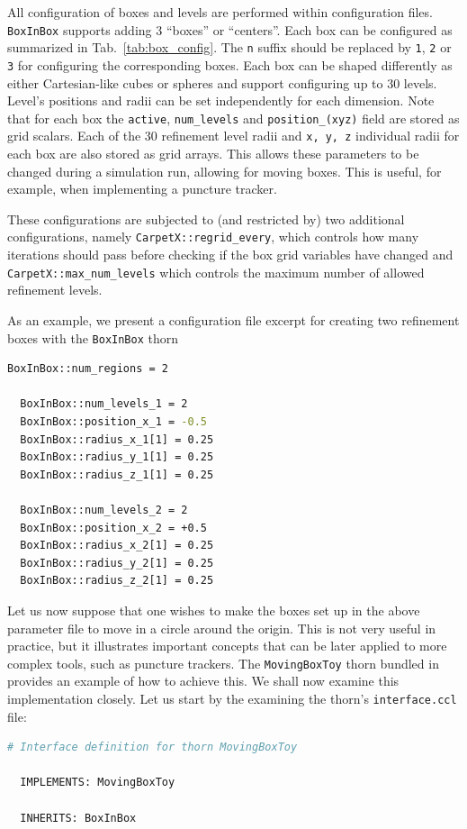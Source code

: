 All configuration of boxes and levels are performed within configuration files. \texttt{BoxInBox} supports adding 3 ``boxes'' or ``centers''. Each box can be configured as summarized in Tab.~\ref{tab:box_config}. The \texttt{n} suffix should be replaced by \texttt{1}, \texttt{2} or \texttt{3} for configuring the corresponding boxes. Each box can be shaped differently as either Cartesian-like cubes or spheres and support configuring up to 30 levels. Level's positions and radii can be set independently for each dimension. Note that for each box the \texttt{active}, \texttt{num\_levels} and \texttt{position\_(xyz)} field are stored as grid scalars. Each of the 30 refinement level radii and \texttt{x, y, z} individual radii for each box are also stored as grid arrays. This allows these parameters to be changed during a simulation run, allowing for moving boxes. This is useful, for example, when implementing a puncture tracker. 

These configurations are subjected to (and restricted by) two additional \CarpetX\space configurations, namely \texttt{CarpetX::regrid\_every}, which controls how many iterations should pass before checking if the box grid variables have changed and \texttt{CarpetX::max\_num\_levels} which controls the maximum number of allowed refinement levels.

As an example, we present a configuration file excerpt for creating two refinement boxes with the \texttt{BoxInBox} thorn

\begin{lstlisting}[language=bash]
  BoxInBox::num_regions = 2

  BoxInBox::num_levels_1 = 2
  BoxInBox::position_x_1 = -0.5
  BoxInBox::radius_x_1[1] = 0.25
  BoxInBox::radius_y_1[1] = 0.25
  BoxInBox::radius_z_1[1] = 0.25

  BoxInBox::num_levels_2 = 2
  BoxInBox::position_x_2 = +0.5
  BoxInBox::radius_x_2[1] = 0.25
  BoxInBox::radius_y_2[1] = 0.25
  BoxInBox::radius_z_2[1] = 0.25
\end{lstlisting}

Let us now suppose that one wishes to make the boxes set up in the above parameter file to move in a circle around the origin. This is not very useful in practice, but it illustrates important concepts that can be later applied to more complex tools, such as puncture trackers. The \texttt{MovingBoxToy} thorn bundled in \CarpetX\space provides an example of how to achieve this. We shall now examine this implementation closely. Let us start by the examining the thorn's \texttt{interface.ccl} file:
%
\begin{lstlisting}[language=bash]
  # Interface definition for thorn MovingBoxToy

  IMPLEMENTS: MovingBoxToy

  INHERITS: BoxInBox
\end{lstlisting}

